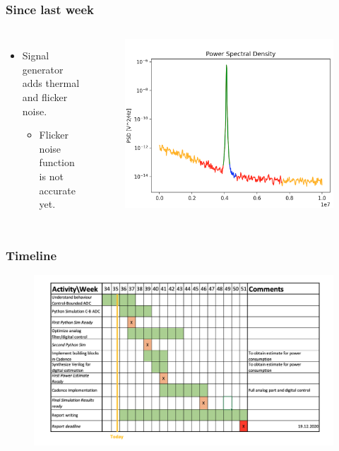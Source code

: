 \documentclass[xcolor={table}]{beamer}
\begin{document}
\begin{frame}
\frametitle{Since last week}
\begin{columns}

\begin{itemize}
\item Signal generator adds thermal and flicker noise.
\begin{itemize}
    \item Flicker noise function is not accurate yet.
\end{itemize}
\end{itemize}

\begin{figure}[htbp]
\begin{center}
\includegraphics[width=\linewidth]{PSD}
\end{center}
\end{figure}

\end{columns}
\end{frame}

\begin{frame}
\frametitle{Timeline}
\begin{figure}[htbp]
\begin{center}
\includegraphics[width=\linewidth]{gantt}
\end{center}
\end{figure}
\end{frame}
\end{document}

